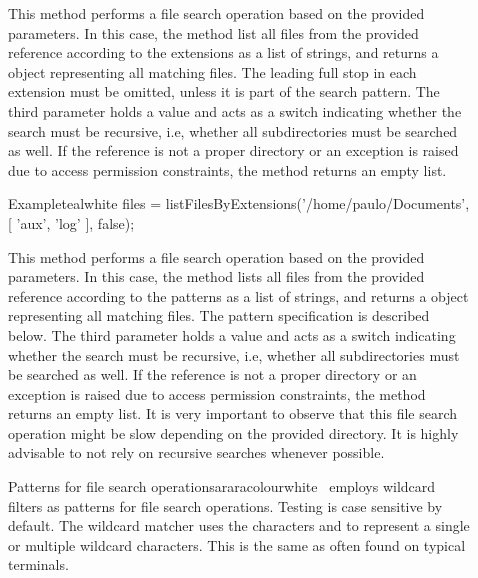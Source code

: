 \begin{description}
\item[] This method performs a file search operation based on the provided parameters. In this case, the method list all files from the provided  reference according to the  extensions as a list of strings, and returns a  object representing all matching files. The leading full stop in each extension must be omitted, unless it is part of the search pattern. The third parameter holds a  value and acts as a switch indicating whether the search must be recursive, i.e, whether all subdirectories must be searched as well. If the reference is not a proper directory or an exception is raised due to access permission constraints, the  method returns an empty list.

\begin{codebox}{Example}{teal}{\icnote}{white}
files = listFilesByExtensions('/home/paulo/Documents',
        [ 'aux', 'log' ], false);
\end{codebox}

\item[] This method performs a file search operation based on the provided parameters. In this case, the method lists all files from the provided  reference according to the  patterns as a list of strings, and returns a  object representing all matching files. The pattern specification is described below. The third parameter holds a  value and acts as a switch indicating whether the search must be recursive, i.e, whether all subdirectories must be searched as well. If the reference is not a proper directory or an exception is raised due to access permission constraints, the  method returns an empty list. It is very important to observe that this file search operation might be slow depending on the provided directory. It is highly advisable to not rely on recursive searches whenever possible.

\begin{messagebox}{Patterns for file search operations}{araracolour}{\icattention}{white}
\arara\ employs wildcard filters as patterns for file search operations. Testing is case sensitive by default. The wildcard matcher uses the characters  and \rbox[araracolour]{*} to represent a single or multiple wildcard characters. This is the same as often found on typical terminals.
\end{messagebox}


\end{description}
